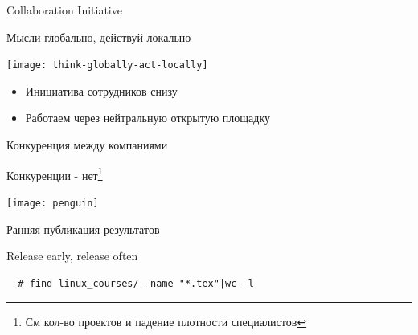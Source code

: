 \begin{frame}{Collaboration Initiative}

  \begin{center}
    Мысли глобально, действуй локально

    \texttt{[image: think-globally-act-locally]}

    \begin{itemize}
      \item Инициатива сотрудников снизу
      \item Работаем через нейтральную открытую площадку
    \end{itemize}

  \end{center}

\end{frame}

\begin{frame}{Конкуренция между компаниями}
      
  \center\Large\alert{Конкуренции - нет}\footnote{См кол-во проектов и падение плотности специалистов}

  \center\texttt{[image: penguin]}

\end{frame}


\begin{frame}[fragile]{Ранняя публикация результатов}

  \begin{center}
    \alert{Release early, release often} 
  \end{center}

  \begin{center}
  \end{center}
\begin{lstlisting}
  # find linux_courses/ -name "*.tex"|wc -l
\end{lstlisting}

\end{frame}

